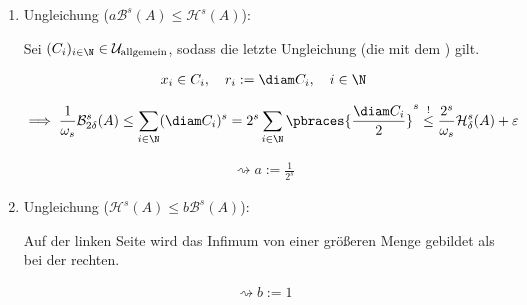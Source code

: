 \begin{solution}
\begin{enumerate}[label = \arabic*.]
    \begin{enumerate}[label = \arabic*.]

        \item Ungleichung ($a \mathcal{B}^s(A) \leq \mathcal{H}^s(A)$):
        
        Sei $(C_i)_{i \in \N} \in \mathcal{U}_\text{allgemein}$, sodass die letzte Ungleichung (die mit dem \Quote{!}) gilt.

        \begin{align*}
            x_i \in C_i,
            \quad
            r_i := \diam C_i,
            \quad
            i \in \N
        \end{align*}

        \begin{align*}
            \implies
            \frac{1}{\omega_s}
            \mathcal{B}_{2 \delta}^s(A)
            \leq
            \sum_{i \in \N}
                (\diam C_i)^s
            =
            2^s
            \sum_{i \in \N}
                \pbraces
                {
                    \frac{\diam C_i}{2}
                }^s
            \stackrel{!}{\leq}
            \frac{2^s}{\omega_s}
            \mathcal{H}_\delta^s(A) + \varepsilon
        \end{align*}

        \begin{align*}
            \rightsquigarrow
            a := \frac{1}{2^s}
        \end{align*}

        \item Ungleichung ($\mathcal{H}^s(A) \leq b \mathcal{B}^s(A)$):
        
        Auf der linken Seite wird das Infimum von einer größeren Menge gebildet als bei der rechten.
    
        \begin{align*}
            \rightsquigarrow
            b := 1
        \end{align*}

    \end{enumerate}

\end{enumerate}

\end{solution}

